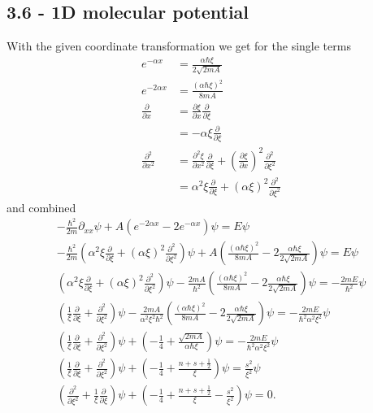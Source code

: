 \documentclass[10pt,a4paper]{book}
\theoremstyle{definition}
\begin{document}
\subsection{3.6 - 1D molecular potential}
With the given coordinate transformation we get for the single terms
\begin{align}
    e^{-\alpha x}&=\frac{\alpha\hbar\xi}{2\sqrt{2mA}}\\
    e^{-2\alpha x}&=\frac{(\alpha\hbar\xi)^2}{8mA}\\
    \frac{\partial}{\partial x}&=\frac{\partial\xi}{\partial x}\frac{\partial}{\partial\xi}\\
    &=-\alpha\xi\frac{\partial}{\partial\xi}\\
    \frac{\partial^2}{\partial x^2}&=\frac{\partial^2\xi}{\partial x^2}\frac{\partial}{\partial\xi}+\left(\frac{\partial\xi}{\partial x}\right)^2\frac{\partial^2}{\partial\xi^2}\\
    &=\alpha^2\xi\frac{\partial}{\partial\xi}+(\alpha\xi)^2\frac{\partial^2}{\partial\xi^2}
\end{align}
and combined
\begin{align}
    -\frac{\hbar^2}{2m}\partial_{xx}\psi+A(e^{-2\alpha x}-2e^{-\alpha x})\psi=E\psi\\
    -\frac{\hbar^2}{2m}\left(\alpha^2\xi\frac{\partial}{\partial\xi}+(\alpha\xi)^2\frac{\partial^2}{\partial\xi^2}\right)\psi+A\left(\frac{(\alpha\hbar\xi)^2}{8mA}-2\frac{\alpha\hbar\xi}{2\sqrt{2mA}}\right)\psi=E\psi\\
    \left(\alpha^2\xi\frac{\partial}{\partial\xi}+(\alpha\xi)^2\frac{\partial^2}{\partial\xi^2}\right)\psi-\frac{2mA}{\hbar^2}\left(\frac{(\alpha\hbar\xi)^2}{8mA}-2\frac{\alpha\hbar\xi}{2\sqrt{2mA}}\right)\psi=-\frac{2mE}{\hbar^2}\psi\\
    \left(\frac{1}{\xi}\frac{\partial}{\partial\xi}+\frac{\partial^2}{\partial\xi^2}\right)\psi-\frac{2mA}{\alpha^2\xi^2\hbar^2}\left(\frac{(\alpha\hbar\xi)^2}{8mA}-2\frac{\alpha\hbar\xi}{2\sqrt{2mA}}\right)\psi=-\frac{2mE}{\hbar^2\alpha^2\xi^2}\psi\\
    \left(\frac{1}{\xi}\frac{\partial}{\partial\xi}+\frac{\partial^2}{\partial\xi^2}\right)\psi+\left(-\frac{1}{4}+\frac{\sqrt{2mA}}{\alpha\hbar\xi}\right)\psi=-\frac{2mE}{\hbar^2\alpha^2\xi^2}\psi\\
    \left(\frac{1}{\xi}\frac{\partial}{\partial\xi}+\frac{\partial^2}{\partial\xi^2}\right)\psi+\left(-\frac{1}{4}+\frac{n+s+\frac{1}{2}}{\xi}\right)\psi=\frac{s^2}{\xi^2}\psi\\
    \left(\frac{\partial^2}{\partial\xi^2}+\frac{1}{\xi}\frac{\partial}{\partial\xi}\right)\psi+\left(-\frac{1}{4}+\frac{n+s+\frac{1}{2}}{\xi}-\frac{s^2}{\xi^2}\right)\psi=0.
\end{align}
\end{document}
